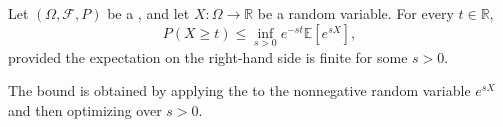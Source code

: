 \begin{proposition} \label{proposition:chernoff_bound_for_tail_probabilities_of_random_variables}
Let $(\Omega, \mathcal{F}, P)$ be a , and let $X : \Omega \to \mathbb{R}$ be a random variable. For every $t \in \mathbb{R}$,
$$P(X \geq t) \leq \inf_{s > 0} e^{-st} \mathbb{E}[e^{sX}],$$
provided the expectation on the right-hand side is finite for some $s > 0$.

The bound is obtained by applying the  to the nonnegative random variable $e^{sX}$ and then optimizing over $s > 0$.
\end{proposition}
